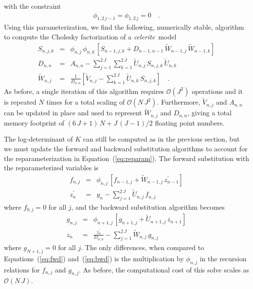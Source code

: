 \documentclass[manuscript, letterpaper]{aastex6}
\newcommand{\celeriteterm}{\emph{celerite}}
\renewcommand{\eqref}[1]{\ref{eq:#1}}
\newcommand{\Eq}[1]{Equation~(\eqref{#1})}
\newcommand{\eq}[1]{\Eq{#1}}
\newcommand{\eqlabel}[1]{\label{eq:#1}}
\begin{document}
{with the constraint
\begin{eqnarray}
    \phi_{1,2\,j-1} = \phi_{1,2\,j} = 0 \quad.
\end{eqnarray}
Using this parameterization, we find the following, numerically stable,
algorithm to compute the Cholesky factorization of a \celeriteterm\ model
\begin{eqnarray}\eqlabel{cholesky-factor}
    S_{n,j,k} &=& \phi_{n,j}\,\phi_{n,k}\,\left[S_{n-1,j,k} +
        D_{n-1,n-1}\,\tilde{W}_{n-1,j}\,\tilde{W}_{n-1,k}\right] \nonumber\\
    D_{n,n} &=& A_{n,n} -
    \sum_{j=1}^{2\,J}\sum_{k=1}^{2\,J} \tilde{U}_{n,j}\,S_{n,j,k}\,\tilde{U}_{n,k}
    \nonumber\\
    \tilde{W}_{n,j} &=& \frac{1}{D_{n,n}}\left[ \tilde{V}_{n,j} -
    \sum_{k=1}^{2\,J}\tilde{U}_{n,k}\,S_{n,j,k} \right] \quad.
\end{eqnarray}
As before, a single iteration of this algorithm requires $\mathcal{O}(J^2)$
operations and it is repeated $N$ times for a total scaling of
$\mathcal{O}(N\,J^2)$.
Furthermore, $\tilde{V}_{n,j}$ and $A_{n,n}$ can be updated in place and used
to represent $\tilde{W}_{n,j}$ and $D_{n,n}$, giving a total memory footprint
of $(6\,J + 1)\,N + J\,(J-1)/2$ floating point numbers.

The log-determinant of $K$ can still be computed as in the previous section,
but we must update the forward and backward substitution algorithms to account
for the reparameterization in \eq{reparam}.
The forward substitution with the reparameterized variables is
\begin{eqnarray}
    f_{n,j} &=& \phi_{n,j}\,\left[f_{n-1,j} +
    \tilde{W}_{n-1,j}\,z_{n-1}^\prime\right] \nonumber\\
    z_n^\prime &=& y_n - \sum_{j=1}^{2\,J} \tilde{U}_{n,j}\,f_{n,j}
\end{eqnarray}
where $f_{0,j} = 0$ for all $j$, and the backward substitution algorithm
becomes
\begin{eqnarray}
    g_{n,j} &=& \phi_{n+1,j}\,\left[g_{n+1,j} +
    \tilde{U}_{n+1,j}\,z_{n+1}\right] \nonumber\\
    z_n &=& \frac{z_n^\prime}{D_{n,n}} - \sum_{j=1}^{2\,J} \tilde{W}_{n,j}\,g_{n,j}
\end{eqnarray}
where $g_{N+1,j} = 0$ for all $j$.
The only differences, when compared to Equations~(\eqref{fwd})
and~(\eqref{bwd}) is the multiplication by $\phi_{n,j}$ in the recursion
relations for $f_{n,j}$ and $g_{n,j}$.
As before, the computational cost of this solve scales as $\mathcal{O}(N\,J)$.

}
\end{document}

